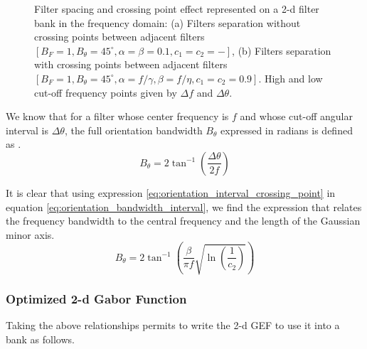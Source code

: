 \documentclass[journal]{IEEEtran}
\begin{document}
\begin{figure}[!ht]
\centering
\caption{Filter spacing and crossing point effect represented on a 2-d filter bank in the frequency domain: (a) Filters separation without crossing points between adjacent filters $[B_F=1, B_{\theta} = 45^{\circ}, \alpha=\beta=0.1, c_1=c_2=-]$, (b) Filters separation with crossing points between adjacent filters $[B_F=1, B_{\theta} = 45^{\circ}, \alpha=f/\gamma, \beta=f/\eta, c_1=c_2=0.9]$. High and low cut-off frequency points given by $\Delta f$ and $\Delta \theta$.}\label{fig:2d_filterbank_spacing}
\end{figure}

We know that for a filter whose center frequency is $f$ and whose cut-off angular interval is $\Delta \theta$, the full orientation bandwidth $B_\theta$ expressed in radians is defined as \cite{Daugman:JOSA:1985}.
\begin{equation}\label{eq:orientation_bandwidth_interval}
    B_{\theta} = 2 \tan^{-1} \left( \frac{\Delta \theta}{2f} \right)
\end{equation}

It is clear that using expression \eqref{eq:orientation_interval_crossing_point} in equation \eqref{eq:orientation_bandwidth_interval}, we find the expression that relates the frequency bandwidth to the central frequency and the length of the Gaussian minor axis.
\begin{equation}\label{eq:orientation_bandwidth}
    B_{\theta} = 2 \tan^{-1} \left( \frac{\beta}{\pi f} \sqrt{\ln \left(\frac{1}{c_2}\right)} \right)
\end{equation}

\subsubsection{Optimized 2-d Gabor Function}
Taking the above relationships permits to write the 2-d GEF to use it into a bank as follows. 
\end{document}

